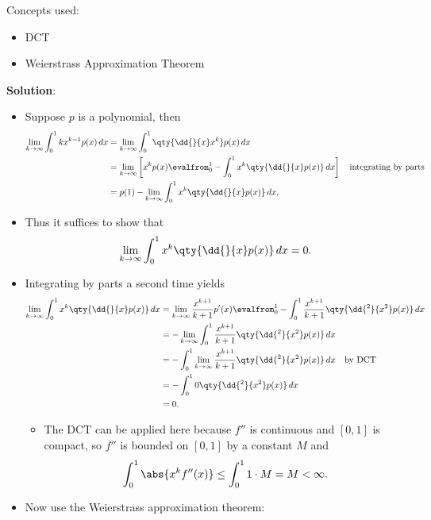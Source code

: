 \begin{solution}

Concepts used:

\begin{itemize}
\tightlist
\item
  DCT
\item
  Weierstrass Approximation Theorem
\end{itemize}

\textbf{Solution}:

\begin{itemize}
\item
  Suppose \(p\) is a polynomial, then
  \begin{align*}
  \lim_{k\to\infty} \int_0^1 kx^{k-1} p(x) \, dx
  &= \lim_{k\to\infty} \int_0^1 \qty{ \dd{}{x}x^k } p(x) \, dx \\
  &= \lim_{k\to\infty} \left[ x^k p(x) \evalfrom_0^1 - \int_0^1 x^k \qty{\dd{}{x} p(x) } \, dx \right] \quad\text{integrating by parts}\\
  &= p(1) - \lim_{k\to\infty} \int_0^1 x^k \qty{\dd{}{x} p(x) } \, dx
  ,\end{align*}
\item
  Thus it suffices to show that
  \begin{align*}
  \lim_{k\to\infty} \int_0^1 x^k \qty{\dd{}{x} p(x) } \, dx = 0
  .\end{align*}
\item
  Integrating by parts a second time yields
  \begin{align*}
  \lim_{k\to\infty} 
  \int_0^1 x^k \qty{\dd{}{x} p(x) } \, dx
  &= \lim_{k\to\infty} 
  {x^{k+1} \over k+1} p'(x) \evalfrom_0^1 - \int_0^1 {x^{k+1} \over k+1} \qty{ \dd{^2}{x^2}p(x)} \, dx \\
  &= - \lim_{k\to\infty} \int_0^1 {x^{k+1} \over k+1} \qty{ \dd{^2}{x^2}p(x)} \, dx \\
  &= - \int_0^1 \lim_{k\to\infty}  {x^{k+1} \over k+1} \qty{ \dd{^2}{x^2}p(x)} \, dx \quad\text{by DCT} \\
  &= - \int_0^1 0 \qty{ \dd{^2}{x^2}p(x)} \, dx \\
  &= 0
  .\end{align*}

  \begin{itemize}
  \tightlist
  \item
    The DCT can be applied here because \(f''\) is continuous and
    \([0, 1]\) is compact, so \(f''\) is bounded on \([0, 1]\) by a
    constant \(M\) and
    \begin{align*}\int_0^1 \abs{x^k f''(x)} \leq \int_0^1 1\cdot M = M < \infty.\end{align*}
  \end{itemize}
\item
  Now use the Weierstrass approximation theorem:


\end{itemize}
\end{solution}
